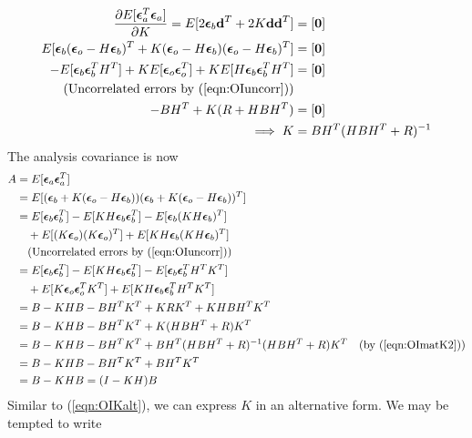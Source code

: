 \begin{align}
\frac{\partial E[\bm{\epsilon}_a^T\bm{\epsilon}_a]}{\partial K} = E[2\bm{\epsilon}_b\textbf{d}^T + 2K\textbf{d}\textbf{d}^T] &= [\textbf{0}] \nonumber \\
E[\bm{\epsilon}_b(\bm{\epsilon}_o -  H\bm{\epsilon}_b)^T + K(\bm{\epsilon}_o -  H\bm{\epsilon}_b)(\bm{\epsilon}_o -  H\bm{\epsilon}_b)^T] &= [\textbf{0}] \nonumber \\
-E[\bm{\epsilon}_b\bm{\epsilon}_b^TH^T] + KE[\bm{\epsilon}_o\bm{\epsilon}_o^T] + KE[H\bm{\epsilon}_b\bm{\epsilon}_b^TH^T] &= [\textbf{0}] \nonumber \\ 
 \text{(Uncorrelated errors by (\ref{eqn:OIuncorr}))} & \nonumber \\
-BH^T + K(R+HBH^T) &= [\textbf{0}] \nonumber \\
\implies K &= BH^T(HBH^T+R)^{-1} \label{eqn:OImatK2}
\end{align}
The analysis covariance is now
\begin{align}
A &= E[\bm{\epsilon}_a\bm{\epsilon}_a^T] \nonumber \\
&= E[(\bm{\epsilon}_b + K(\bm{\epsilon}_o - H\bm{\epsilon}_b))(\bm{\epsilon}_b + K(\bm{\epsilon}_o - H\bm{\epsilon}_b))^T] \nonumber \\
&= E[\bm{\epsilon}_b\bm{\epsilon}_b^T] - E[KH\bm{\epsilon}_b\bm{\epsilon}_b^T] - E[\bm{\epsilon}_b(KH\bm{\epsilon}_b)^T] \nonumber \\
&\quad + E[(K\bm{\epsilon}_o)(K\bm{\epsilon}_o)^T] + E[KH\bm{\epsilon}_b(KH\bm{\epsilon}_b)^T] \nonumber \\
&\quad \text{(Uncorrelated errors by (\ref{eqn:OIuncorr}))} \nonumber \\
&= E[\bm{\epsilon}_b\bm{\epsilon}_b^T] - E[KH\bm{\epsilon}_b\bm{\epsilon}_b^T] - E[\bm{\epsilon}_b\bm{\epsilon}_b^TH^TK^T] \nonumber \\
&\quad + E[K\bm{\epsilon}_o\bm{\epsilon}_o^TK^T] + E[KH\bm{\epsilon}_b\bm{\epsilon}_b^TH^TK^T] \nonumber \\
&= B - KHB - BH^TK^T + KRK^T + KHBH^TK^T \nonumber \\
&= B - KHB - BH^TK^T + K(HBH^T+R)K^T \nonumber \\
&= B - KHB - BH^TK^T + BH^T(HBH^T+R)^{-1}(HBH^T+R)K^T &\text{(by (\ref{eqn:OImatK2}))} \nonumber \\
&= B - KHB - BH^TK^T + BH^TK^T \nonumber \\
&= B - KHB = (I-KH)B \label{eqn:OIcovA}
\end{align}
Similar to (\ref{eqn:OIKalt}), we can express $K$ in an alternative form. We may be tempted to write 
